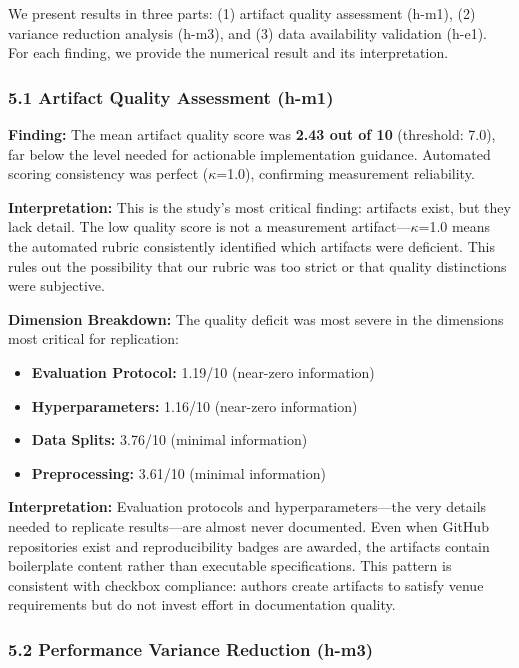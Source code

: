 
We present results in three parts: (1) artifact quality assessment (h-m1), (2) variance reduction analysis (h-m3), and (3) data availability validation (h-e1). For each finding, we provide the numerical result and its interpretation.

\subsubsection{5.1 Artifact Quality Assessment (h-m1)}

\textbf{Finding:} The mean artifact quality score was \textbf{2.43 out of 10} (threshold: 7.0), far below the level needed for actionable implementation guidance. Automated scoring consistency was perfect ($\kappa$=1.0), confirming measurement reliability.

\textbf{Interpretation:} This is the study's most critical finding: artifacts exist, but they lack detail. The low quality score is not a measurement artifact---$\kappa$=1.0 means the automated rubric consistently identified which artifacts were deficient. This rules out the possibility that our rubric was too strict or that quality distinctions were subjective.

\textbf{Dimension Breakdown:} The quality deficit was most severe in the dimensions most critical for replication:
\begin{itemize}
\item \textbf{Evaluation Protocol:} 1.19/10 (near-zero information)
\item \textbf{Hyperparameters:} 1.16/10 (near-zero information)
\item \textbf{Data Splits:} 3.76/10 (minimal information)
\item \textbf{Preprocessing:} 3.61/10 (minimal information)
\end{itemize}

\textbf{Interpretation:} Evaluation protocols and hyperparameters---the very details needed to replicate results---are almost never documented. Even when GitHub repositories exist and reproducibility badges are awarded, the artifacts contain boilerplate content rather than executable specifications. This pattern is consistent with checkbox compliance: authors create artifacts to satisfy venue requirements but do not invest effort in documentation quality.

\subsubsection{5.2 Performance Variance Reduction (h-m3)}

